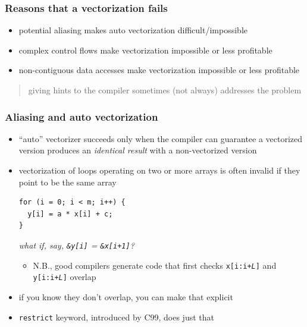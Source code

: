 \documentclass[12pt,dvipdfmx]{beamer}
\newcommand{\ao}[1]{{\color{blue}#1}}
\newcommand{\aka}[1]{{\color{red}#1}}
\begin{document}
\begin{frame}
\frametitle{Reasons that a vectorization fails}
\begin{itemize}
\item \ao{potential aliasing} makes auto vectorization difficult/impossible
\item \ao{complex control flows}
  make vectorization impossible or less profitable
\item \ao{non-contiguous data accesses}
  make vectorization impossible or less profitable
\end{itemize}

\begin{quote}
giving hints to the compiler sometimes (not always) addresses the problem
\end{quote}

\end{frame}

\begin{frame}[fragile]
\frametitle{Aliasing and auto vectorization}
\begin{itemize}
\item ``auto'' vectorizer succeeds only when the compiler
  can guarantee a vectorized version produces an \ao{\it identical
  result} with a non-vectorized version

\item vectorization 
  of loops operating on two or more arrays
  is often invalid if they point to be the same array
\begin{lstlisting}
for (i = 0; i < m; i++) {
  y[i] = a * x[i] + c;
}    
\end{lstlisting}
\aka{\it what if, say, {\tt \&y[i]} = {\tt \&x[i+1]}?}
\begin{itemize}
\item N.B., good compilers generate code that first
  checks {\tt x[i:i+{\it L}]} and {\tt y[i:i+{\it L}]} overlap
\end{itemize}

\item if you know they don't overlap, you can make that explicit

\item \ao{\tt restrict} keyword, introduced by C99,
  does just that

\end{itemize}
\end{frame}
\end{document}
